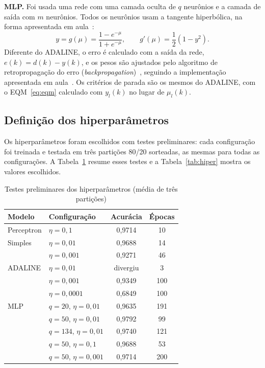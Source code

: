 \documentclass[conference]{IEEEtran}
\begin{document}
\textbf{MLP.} Foi usada uma rede com uma camada oculta de $q$ neurônios e a
camada de saída com $m$ neurônios. Todos os neurônios usam a tangente
hiperbólica, na forma apresentada em aula~\cite{b1}:
\begin{equation}
y = g(\mu) = \frac{1 - e^{-\mu}}{1 + e^{-\mu}}, \qquad
g'(\mu) = \frac{1}{2} \left( 1 - y^2 \right).
\label{eq:ativacao}
\end{equation}
Diferente do ADALINE, o erro é calculado com a saída da rede,
$e(k) = d(k) - y(k)$, e os pesos são ajustados pelo algoritmo de
retropropagação do erro (\textit{backpropagation})~\cite{b4}, seguindo a
implementação apresentada em aula~\cite{b1}. Os critérios de parada são os
mesmos do ADALINE, com o EQM~\eqref{eq:eqm} calculado com $y_l(k)$ no lugar
de $\mu_l(k)$.

\subsection{Definição dos hiperparâmetros}

Os hiperparâmetros foram escolhidos com testes preliminares: cada
configuração foi treinada e testada em três partições 80/20 sorteadas, as
mesmas para todas as configurações. A Tabela~\ref{tab:testes} resume esses
testes e a Tabela~\ref{tab:hiper} mostra os valores escolhidos.

\begin{table}[htbp]
\caption{Testes preliminares dos hiperparâmetros (média de três partições)}
\begin{center}
\begin{tabular}{|l|l|c|c|}
\hline
\textbf{Modelo} & \textbf{Configuração} & \textbf{Acurácia} & \textbf{Épocas} \\
\hline
Perceptron & $\eta = 0{,}1$ & 0,9714 & 10 \\
Simples & $\eta = 0{,}01$ & 0,9688 & 14 \\
 & $\eta = 0{,}001$ & 0,9271 & 46 \\
\hline
ADALINE & $\eta = 0{,}01$ & divergiu & 3 \\
 & $\eta = 0{,}001$ & 0,9349 & 100 \\
 & $\eta = 0{,}0001$ & 0,6849 & 100 \\
\hline
MLP & $q = 20$, $\eta = 0{,}01$ & 0,9635 & 191 \\
 & $q = 50$, $\eta = 0{,}01$ & 0,9792 & 99 \\
 & $q = 134$, $\eta = 0{,}01$ & 0,9740 & 121 \\
 & $q = 50$, $\eta = 0{,}1$ & 0,9688 & 53 \\
 & $q = 50$, $\eta = 0{,}001$ & 0,9714 & 200 \\
\hline
\end{tabular}
\label{tab:testes}
\end{center}
\end{table}
\end{document}
